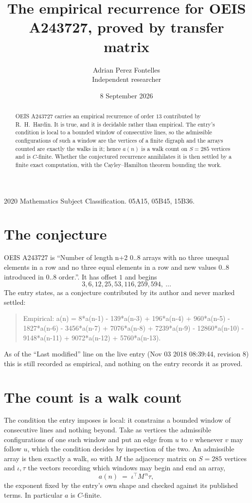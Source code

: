 \documentclass[11pt,a4paper]{article}
\title{The empirical recurrence for OEIS A243727, proved by transfer matrix}
\author{Adrian Perez Fontelles\\ \small Independent researcher}
\date{8 September 2026}
\theoremstyle{plain}
\theoremstyle{definition}
\begin{document}
\maketitle

\begin{abstract}
OEIS A243727 carries an empirical recurrence of order $13$ contributed by R.~H.~Hardin. It is
true, and it is decidable rather than empirical. The entry's condition is local to a bounded window of consecutive lines, so
the admissible configurations of such a window are the vertices of a finite digraph and the
arrays counted are exactly the walks in it; hence $a(n)$ is a walk count on $S=285$ vertices
and is $C$-finite. Whether the conjectured recurrence annihilates it is then settled by a
finite exact computation, with the Cayley--Hamilton theorem bounding the work.
\end{abstract}

\noindent\small 2020 Mathematics Subject Classification. 05A15, 05B45, 15B36.\normalsize

\section{The conjecture}

OEIS A243727 is ``Number of length n+2 0..8 arrays with no three unequal elements in a row and no three equal elements in a row and new values 0..8 introduced in 0..8 order.''. It has offset $1$ and begins
\[
3, 6, 12, 25, 53, 116, 259, 594,\ \dots
\]
The entry states, as a conjecture contributed by its author and never marked settled:
\begin{quote}
Empirical: a(n) = 8*a(n-1) - 139*a(n-3) + 196*a(n-4) + 960*a(n-5) - 1827*a(n-6) - 3456*a(n-7) + 7076*a(n-8) + 7239*a(n-9) - 12860*a(n-10) - 9148*a(n-11) + 9072*a(n-12) + 5760*a(n-13).
\end{quote}
As of the ``Last modified'' line on the live entry (Nov 03 2018 08:39:44, revision 8) this is still
recorded as empirical, and nothing on the entry records it as proved.

\section{The count is a walk count}

The condition the entry imposes is local: it constrains a bounded window of consecutive lines and nothing beyond. Take as
vertices the admissible configurations of one such window and put an edge from $u$ to $v$
whenever $v$ may follow $u$, which the condition decides by inspection of the two. An
admissible array is then exactly a walk, so with $M$ the adjacency matrix on $S=285$ vertices
and $\iota,\tau$ the vectors recording which windows may begin and end an array,
\[
a(n)\;=\;\iota^{\!\top}M^{\,n}\tau ,
\]
the exponent fixed by the entry's own shape and checked against its published terms. In
particular $a$ is $C$-finite.
\end{document}
